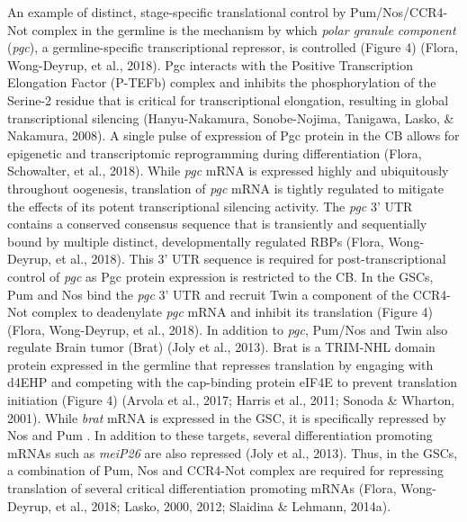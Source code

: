 \documentclass[12pt,twoside]{reedthesis}
\begin{document}
An example of distinct, stage-specific translational control by
Pum/Nos/CCR4-Not complex in the germline is the mechanism by which
\emph{polar granule component} (\emph{pgc}), a germline-specific transcriptional
repressor, is controlled (Figure 4) (Flora, Wong-Deyrup, et al., 2018). Pgc interacts with
the Positive Transcription Elongation Factor (P-TEFb) complex and
inhibits the phosphorylation of the Serine-2 residue that is critical
for transcriptional elongation, resulting in global transcriptional
silencing (Hanyu-Nakamura, Sonobe-Nojima, Tanigawa, Lasko, \& Nakamura, 2008). A single pulse of expression of Pgc
protein in the CB allows for epigenetic and transcriptomic reprogramming
during differentiation (Flora, Schowalter, et al., 2018). While \emph{pgc} mRNA is expressed
highly and ubiquitously throughout oogenesis, translation of \emph{pgc} mRNA
is tightly regulated to mitigate the effects of its potent
transcriptional silencing activity. The \emph{pgc} 3' UTR contains a
conserved consensus sequence that is transiently and sequentially bound
by multiple distinct, developmentally regulated RBPs (Flora, Wong-Deyrup, et al., 2018).
This 3' UTR sequence is required for post-transcriptional control of
\emph{pgc} as Pgc protein expression is restricted to the CB. In the GSCs,
Pum and Nos bind the \emph{pgc} 3' UTR and recruit Twin a component of the
CCR4-Not complex to deadenylate \emph{pgc} mRNA and inhibit its translation
(Figure 4) (Flora, Wong-Deyrup, et al., 2018). In addition to \emph{pgc}, Pum/Nos and Twin also
regulate Brain tumor (Brat) (Joly et al., 2013). Brat is a TRIM-NHL domain
protein expressed in the germline that represses translation by engaging
with d4EHP and competing with the cap-binding protein eIF4E to prevent
translation initiation (Figure 4) (Arvola et al., 2017; Harris et al., 2011; Sonoda \& Wharton, 2001). While \emph{brat} mRNA is expressed in the GSC, it is
specifically repressed by Nos and Pum . In addition to these targets,
several differentiation promoting mRNAs such as \emph{meiP26} are also
repressed (Joly et al., 2013). Thus, in the GSCs, a combination of Pum, Nos
and CCR4-Not complex are required for repressing translation of several
critical differentiation promoting mRNAs (Flora, Wong-Deyrup, et al., 2018; Lasko, 2000, 2012; Slaidina \& Lehmann, 2014a).
\end{document}
